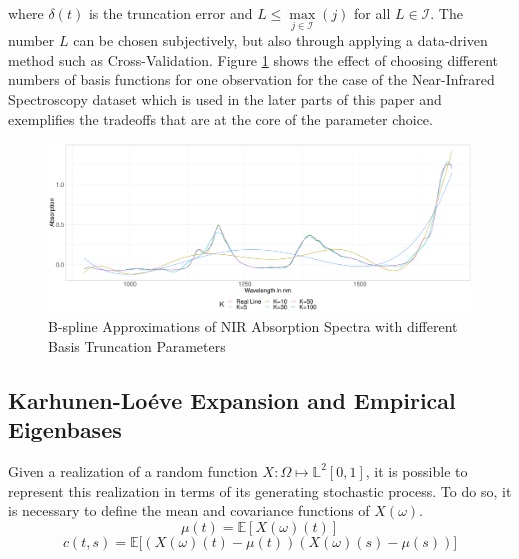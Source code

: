 \documentclass[11pt,twoside,a4paper]{article}
\begin{document}
	where $\delta(t)$ is the truncation error and $L \leq \max\limits_{j \in \mathcal{I}}(j)$ for all $L \in \mathcal{I}$. The number $L$ can be chosen subjectively, but also through applying a data-driven method such as Cross-Validation. Figure \ref{Different_Expansions} shows the effect of choosing different numbers of basis functions for one observation for the case of the Near-Infrared Spectroscopy dataset which is used in the later parts of this paper and exemplifies the tradeoffs that are at the core of the parameter choice.
			
	\begin{figure}[H]
		\includegraphics[width=\textwidth]{../Graphics/basis_expansions.pdf}
		\caption{B-spline Approximations of NIR Absorption Spectra with different Basis Truncation Parameters}
		\label{Different_Expansions}
	\end{figure}
	
	\subsection{Karhunen-Lo\'{e}ve Expansion and Empirical Eigenbases}\hypertarget{KL}{}
	Given a realization of a random function $X: \Omega \mapsto \mathbb{L}^2[0,1]$, it is possible to represent this realization in terms of its generating stochastic process. To do so, it is necessary to define the mean and covariance functions of $X(\omega)$.
	\begin{equation}\label{MeanFunction}
		\mu(t) = \mathbb{E}\left[ X(\omega)(t) \right]
	\end{equation}
	\begin{equation}\label{CovarianceFunction}
		c(t,s) = \mathbb{E}\big[ \left( X(\omega)(t) - \mu(t) \right) \left( X(\omega)(s) - \mu(s) \right) \big]
	\end{equation}
\end{document}
